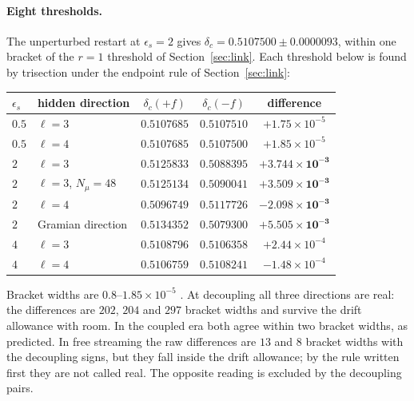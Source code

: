 \paragraph{Eight thresholds.} The unperturbed restart at $\epsilon_s=2$ gives $\delta_c=0.5107500\pm0.0000093$, within one bracket of the $r=1$ threshold of Section~\ref{sec:link}. Each threshold below is found by trisection under the endpoint rule of Section~\ref{sec:link}:
\begin{center}\small\begin{tabular}{llccc}\toprule
$\epsilon_s$ & hidden direction & $\delta_c(+f)$ & $\delta_c(-f)$ & difference\\\midrule
$0.5$ & $\ell=3$ & $0.5107685$ & $0.5107510$ & $+1.75\times10^{-5}$\\
$0.5$ & $\ell=4$ & $0.5107685$ & $0.5107500$ & $+1.85\times10^{-5}$\\
$2$ & $\ell=3$ & $0.5125833$ & $0.5088395$ & $\mathbf{+3.744\times10^{-3}}$\\
$2$ & $\ell=3$, $N_\mu=48$ & $0.5125134$ & $0.5090041$ & $\mathbf{+3.509\times10^{-3}}$\\
$2$ & $\ell=4$ & $0.5096749$ & $0.5117726$ & $\mathbf{-2.098\times10^{-3}}$\\
$2$ & Gramian direction & $0.5134352$ & $0.5079300$ & $\mathbf{+5.505\times10^{-3}}$\\
$4$ & $\ell=3$ & $0.5108796$ & $0.5106358$ & $+2.44\times10^{-4}$\\
$4$ & $\ell=4$ & $0.5106759$ & $0.5108241$ & $-1.48\times10^{-4}$\\\bottomrule\end{tabular}\end{center}
Bracket widths are $0.8$--$1.85\times10^{-5}$ . At decoupling all three directions are real: the differences are $202$, $204$ and $297$ bracket widths and survive the drift allowance with room. In the coupled era both agree within two bracket widths, as predicted. In free streaming the raw differences are $13$ and $8$ bracket widths with the decoupling signs, but they fall inside the drift allowance; by the rule written first they are not called real. The opposite reading is excluded by the decoupling pairs.

